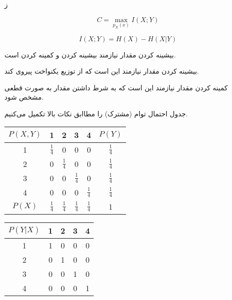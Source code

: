 \SubProblem
{ز}
{
    \begin{equation*}
        C = \max_{p_X(x)} I(X;Y)
    \end{equation*}
    
    \begin{equation*}
        I(X;Y) = H(X) - H(X|Y)
    \end{equation*}
    
    بیشینه کردن مقدار 
    نیازمند بیشینه کردن 
    و کمینه کردن 
    است.
    
    بیشینه کردن مقدار  
    نیازمند این است که 
    از توزیع یکنواخت پیروی کند.
    
    کمینه کردن مقدار  
    نیازمند این است که به شرط داشتن 
    مقدار 
    به صورت قطعی مشخص شود.
    
    جدول احتمال توام (مشترک) را مطاابق نکات بالا تکمیل می‌کنیم.
    
    \begin{latin}
    \begin{center}
      \renewcommand{\arraystretch}{1.6}
      \begin{tabular}{| c | c | c | c | c | c |}
        \hline
        $P(X,Y)$ & 1 & 2 & 3 & 4 & $P(Y)$ \\ \hline
        1 & $\frac{1}{4}$ & 0 & 0 & 0 & $\frac{1}{4}$ \\ \hline
        2 & 0 & $\frac{1}{4}$ & 0 & 0 & $\frac{1}{4}$ \\ \hline
        3 & 0 & 0 & $\frac{1}{4}$ & 0 & $\frac{1}{4}$ \\ \hline
        4 & 0 & 0 & 0 & $\frac{1}{4}$ & $\frac{1}{4}$ \\ \hline
        $P(X)$ & $\frac{1}{4}$ & $\frac{1}{4}$ & $\frac{1}{4}$ & $\frac{1}{4}$ & 1 \\
        \hline
      \end{tabular}
    \end{center}
    \end{latin}

    \begin{latin}
    \begin{center}
      \renewcommand{\arraystretch}{1.6}
      \begin{tabular}{| c | c | c | c | c |}
        \hline
        $P(Y|X)$ & 1 & 2 & 3 & 4 \\ \hline
        1 & 1 & 0 & 0 & 0 \\ \hline
        2 & 0 & 1 & 0 & 0 \\ \hline
        3 & 0 & 0 & 1 & 0 \\ \hline
        4 & 0 & 0 & 0 & 1 \\
        \hline
      \end{tabular}
    \end{center}
    \end{latin}
    
}
